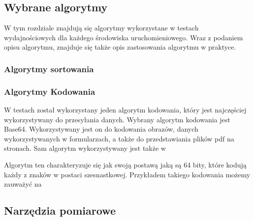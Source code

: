 \subsection*{Wybrane algorytmy}
W tym rozdziale znajdują się algorytmy wykorzystane w testach wydajnościowych dla każdego środowiska uruchomieniowego. Wraz z podaniem opisu algorytmu, znajduje się także opis zastosowania algorytmu w praktyce.

\subsubsection*{Algorytmy sortowania}

\subsubsection*{Algorytmy Kodowania}
W testach został wykorzystany jeden algorytm kodowania, który jest najczęściej wykorzystywany do przesyłania danych. Wybrany algorytm kodowania jest Base64. Wykorzystywany jest on do kodowania obrazów, danych wykorzystywanych w formularzach, a także do przedstawiania plików pdf na stronach. Sam algorytm wykorzystywany jest także w 

Algorytm ten charakteryzuje się jak swoją postawą jaką są 64 bity, które kodują każdy z znaków w postaci szesnastkowej. Przykładem takiego kodowania możemy zauważyć na 

\subsection*{Narzędzia pomiarowe}
